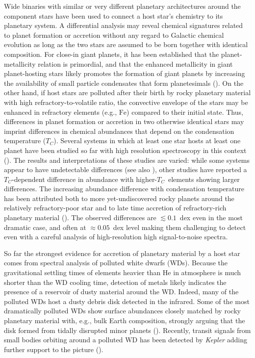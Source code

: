 \documentclass[modern, letterpaper]{aastex61}
\newcommand{\project}[1]{\textsl{#1}}
\newcommand*\elem[1]{\ensuremath{\mathrm{#1}}}
\newcommand{\Tcondens}{\ensuremath{T_C}}
\begin{document}
Wide binaries with similar or very different planetary architectures around the
component stars have been used to connect a host star's chemistry to its
planetary system.
A differential analysis may reveal chemical signatures related to planet
formation or accretion without any regard to Galactic chemical evolution as
long as the two stars are assumed to be born together with identical
composition.
For close-in giant planets, it has been established that the planet-metallicity
relation is primordial, and that the enhanced metallicity in giant
planet-hosting stars likely promotes the formation of giant planets by
increasing the availability of small particle condensates that form
planetesimals (\citealt{Fischer:2005aa}).
On the other hand, if host stars are polluted after their birth by rocky
planetary material with high refractory-to-volatile ratio, the convective
envelope of the stars may be enhanced in refractory elements (e.g., \elem{Fe})
compared to their initial state.
Thus, differences in planet formation or accretion in two otherwise identical
stars may imprint differences in chemical abundances that depend on the
condensation temperature (\Tcondens).
Several systems in which at least one star hosts at least one planet
have been studied so far with high resolution spectroscopy in this context
(\citealt{Teske:2013aa,Mack:2014aa,Liu:2014aa,Teske:2015aa,Saffe:2015aa,
  Ramirez:2015aa,Biazzo:2015aa,Mack:2016aa,Teske:2016aa,Teske:2016ab}).
The results and interpretations of these studies are varied:
while some systems appear to have undetectable differences
(see also \citealt{Desidera:2004aa,Gratton:2001aa}), other
studies have reported a \Tcondens-dependent difference in abundance
with higher-\Tcondens\ elements showing larger differences.
The increasing abundance difference with condensation temperature has been
attributed both to more yet-undiscovered rocky planets around the relatively
refractory-poor star and to late time accretion of refractory-rich planetary
material (\citealt{Ramirez:2015aa,Biazzo:2015aa}).
The observed differences are $\lesssim 0.1$~dex even in the most dramatic case,
and often at $\approx 0.05$~dex level making them challenging to detect even
with a careful analysis of high-resolution high signal-to-noise spectra.

So far the strongest evidence for accretion of planetary material by a host
star comes from spectral analysis of polluted white dwarfs (WDs).
Because the gravitational settling times of elements heavier than \elem{He} in
atmosphere is much shorter than the WD cooling time, detection of metals likely
indicates the presence of a reservoir of dusty material around the WD.
Indeed, many of the polluted WDs host a dusty debris disk detected
in the infrared.
Some of the most dramatically polluted WDs show
surface abundances closely matched by rocky planetary material
with, e.g., bulk Earth composition, strongly arguing
that the disk formed from tidally disrupted minor planets
(\citealt{Zuckerman:2007aa,Klein:2010aa}).
Recently, transit signals from small bodies orbiting around a polluted WD
has been detected by \project{Kepler} adding further support to the picture
(\citealt{2015Natur.526..546V}).
\end{document}
